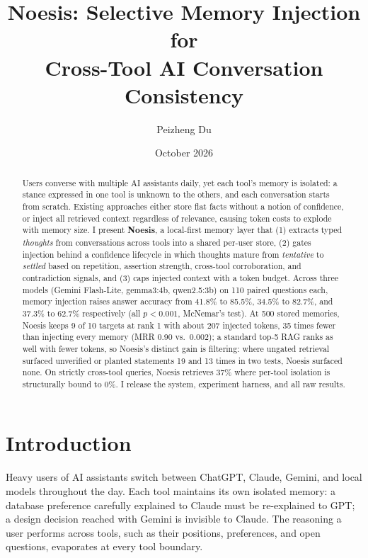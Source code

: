 \documentclass[11pt]{article}
\title{Noesis: Selective Memory Injection for\\Cross-Tool AI Conversation Consistency}
\author{Peizheng Du}
\date{October 2026}
\begin{document}
\maketitle

\begin{abstract}
Users converse with multiple AI assistants daily, yet each tool's memory is
isolated: a stance expressed in one tool is unknown to the others, and each
conversation starts from scratch. Existing approaches either store flat facts
without a notion of confidence, or inject all retrieved context regardless of
relevance, causing token costs to explode with memory size. I present
\textbf{Noesis}, a local-first memory layer that (1) extracts typed
\emph{thoughts} from conversations across tools into a shared per-user store,
(2) gates injection behind a confidence lifecycle in which thoughts mature from
\emph{tentative} to \emph{settled} based on repetition, assertion strength,
cross-tool corroboration, and contradiction signals, and (3) caps injected
context with a token budget. Across three models (Gemini Flash-Lite,
gemma3:4b, qwen2.5:3b) on 110 paired questions each, memory injection raises
answer accuracy from 41.8\% to 85.5\%, 34.5\% to 82.7\%, and 37.3\% to
62.7\% respectively (all $p<0.001$, McNemar's test). At 500 stored memories,
Noesis keeps 9 of 10 targets at rank 1 with about 207 injected tokens, 35
times fewer than injecting every memory (MRR 0.90 vs.\ 0.002); a standard
top-5 RAG ranks as well with fewer tokens, so Noesis's distinct gain is
filtering: where ungated retrieval surfaced unverified or planted statements
19 and 13 times in two tests, Noesis surfaced none. On strictly cross-tool
queries, Noesis retrieves 37\% where per-tool isolation is structurally bound
to 0\%. I release the system, experiment harness, and all raw results.
\end{abstract}

\section{Introduction}
\label{sec:intro}

Heavy users of AI assistants switch between ChatGPT, Claude, Gemini, and local
models throughout the day. Each tool maintains its own isolated memory: a
database preference carefully explained to Claude must be re-explained to
GPT; a design decision reached with Gemini is invisible to Claude. The
reasoning a user performs across tools, such as their positions, preferences,
and open questions, evaporates at every tool boundary.
\end{document}

